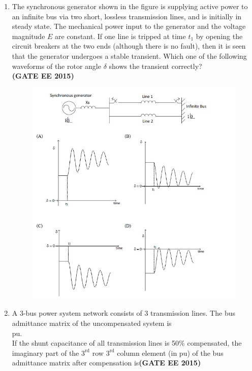 \documentclass[a4paper,12pt]{exam}
\theoremstyle{remark}
\begin{document}
\begin{enumerate}
\item The synchronous generator shown in the figure is supplying active power to an infinite bus via two short, lossless transmission lines, and is initially in steady state. The mechanical power input to the generator and the voltage magnitude $E$ are constant. If one line is tripped at time $t_1$ by opening the circuit breakers at the two ends (although there is no fault), then it is seen that the generator undergoes a stable transient. Which one of the following waveforms of the rotor angle $\delta$ shows the transient correctly?\\\hfill{\textbf{(GATE EE 2015)}}
\begin{figure}[H]
    \centering
    \includegraphics[width=1\columnwidth]{figs/2Q 26.png}
    \caption{}
    \label{fig:placeholder}
\end{figure}


\item A 3-bus power system network consists of 3 transmission lines. The bus admittance matrix of the uncompensated system is\\
pu.\\
If the shunt capacitance of all transmission lines is 50\% compensated, the imaginary part of the $3^{\text{rd}}$ row $3^{\text{rd}}$ column element (in pu) of the bus admittance matrix after compensation is\hfill{\textbf{(GATE EE 2015)}}


\end{enumerate}
\end{document}
